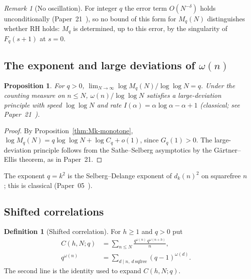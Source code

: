 \documentclass[11pt]{amsart}
\newtheorem{proposition}[theorem]{Proposition}
\theoremstyle{definition}
\newtheorem{definition}[theorem]{Definition}
\theoremstyle{remark}
\newtheorem{remark}[theorem]{Remark}
\newcommand{\om}{\omega}
\begin{document}
\begin{remark}[No oscillation]
For integer $q$ the error term $O(N^{-\delta})$ holds unconditionally
(Paper~21~\cite[Cor.~6.2]{P21}), so no bound of this form for $M_q(N)$ distinguishes
whether RH holds: $M_q$ is determined, up to this error, by the singularity of $F_q(s+1)$
at $s=0$.
\end{remark}

\subsection{The exponent and large deviations of $\om(n)$}
\label{ss:k2}

\begin{proposition}
\label{thm:k2}
For $q>0$, $\lim_{N\to\infty}\log M_q(N)/\log\log N=q$. Under the counting measure on
$n\le N$, $\om(n)/\log\log N$ satisfies a large-deviation principle with speed
$\log\log N$ and rate $I(\alpha)=\alpha\log\alpha-\alpha+1$ \textup{(}classical; see
Paper~21~\cite[Thm.~4.1]{P21}\textup{)}.
\end{proposition}

\begin{proof}
By Proposition~\ref{thm:Mk-monotone}, $\log M_q(N)=q\log\log N+\log C_q+o(1)$, since
$G_q(1)>0$. The large-deviation principle follows from the Sathe--Selberg asymptotics by
the G\"artner--Ellis theorem, as in Paper~21.
\end{proof}

The exponent $q=k^2$ is the Selberg--Delange exponent of $d_k(n)^2$ on squarefree $n$;
this is classical (Paper~05~\cite[Thm.~3.2]{P05}).

\subsection{Shifted correlations}
\label{ss:correlation}

\begin{definition}[Shifted correlation]
For $h \ge 1$ and $q > 0$ put
\begin{align}
  C(h,N;q) &= \sum_{n\le N}\frac{q^{\om(n)}\,q^{\om(n+h)}}{n}, \\
  q^{\om(n)} &= \sum_{d\mid n,\ d\ \mathrm{sqfree}}(q-1)^{\om(d)} .
\end{align}
The second line is the identity used to expand $C(h,N;q)$.
\end{definition}
\end{document}
